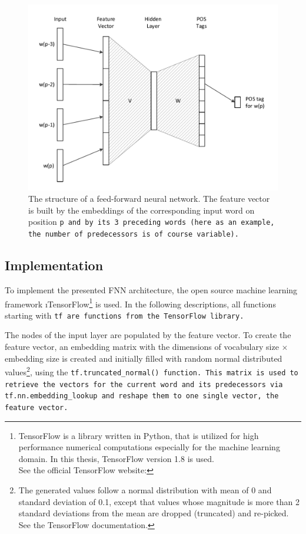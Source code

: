 \begin{figure}[ht]
	\includegraphics[width=\textwidth]{images/fnn_structure}
	\caption[Structure of a Feed-forward Neural Network]{The structure of a feed-forward neural network. The feature vector is built by the embeddings of the corresponding input word on position \tt{p} and by its \tt{3} preceding words (here as an example, the number of predecessors is of course variable).}
	\label{f.fnn.structure}
\end{figure}

\subsection{Implementation}\label{c.postagging.fnn.implementation}
To implement the presented FNN architecture, the open source machine learning framework \i{TensorFlow}\footnote{TensorFlow is a library written in Python, that is utilized for high performance numerical computations especially for the machine learning domain. In this thesis, TensorFlow version 1.8 is used.\\See the official TensorFlow website: } is used. In the following descriptions, all functions starting with \tt{tf} are functions from the TensorFlow library.

The nodes of the input layer are populated by the feature vector. To create the feature vector, an embedding matrix with the dimensions of vocabulary size $\times$ embedding size is created and initially filled with random normal distributed values\footnote{The generated values follow a normal distribution with mean of 0 and standard deviation of 0.1, except that values whose magnitude is more than 2 standard deviations from the mean are dropped (truncated) and re-picked. See the TensorFlow documentation.}, using the \tt{tf.truncated\_normal()} function. This matrix is used to retrieve the vectors for the current word and its predecessors via \tt{tf.nn.embedding\_lookup} and reshape them to one single vector, the feature vector.

